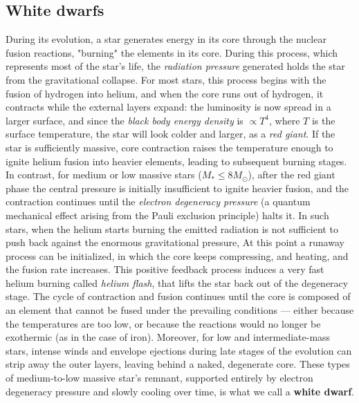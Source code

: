 \subsection{White dwarfs}
During its evolution, a star generates energy in its core through the nuclear fusion reactions, "burning" the elements in its core. 
During this process, which represents most of the star's life, the \textit{radiation pressure} generated holds the star from the gravitational collapse. 
For most stars, this process begins with the fusion of hydrogen into helium, and when the core runs out of hydrogen, it contracts while the external layers expand: the luminosity is now spread in a larger surface, and since the \textit{black body energy density} is $\propto T^4$, where $T$ is the surface temperature, the star will look colder and larger, as a \textit{red giant}.
If the star is sufficiently massive, core contraction raises the temperature enough to ignite helium fusion into heavier elements, leading to subsequent burning stages.  
In contrast, for medium or low massive stars ($M_*\le 8M_\odot$), after the red giant phase the central pressure is initially insufficient to ignite heavier fusion, and the contraction continues until the \textit{electron degeneracy pressure} (a quantum mechanical effect arising from the Pauli exclusion principle) halts it.
In such stars, when the helium starts burning the emitted radiation is not sufficient to push back against the enormous gravitational pressure, 
At this point a runaway process can be initialized, in which the core keeps compressing, and heating, and the fusion rate increases.
This positive feedback process induces a very fast helium burning called \textit{helium flash}, that lifts the star back out of the degeneracy stage.
The cycle of contraction and fusion continues until the core is composed of an element that cannot be fused under the prevailing conditions — either because the temperatures are too low, or because the reactions would no longer be exothermic (as in the case of iron).  
Moreover, for low and intermediate-mass stars, intense winds and envelope ejections during late stages of the evolution can strip away the outer layers, leaving behind a naked, degenerate core.
These types of medium-to-low massive star's remnant, supported entirely by electron degeneracy pressure and slowly cooling over time, is what we call a \textbf{white dwarf}.


